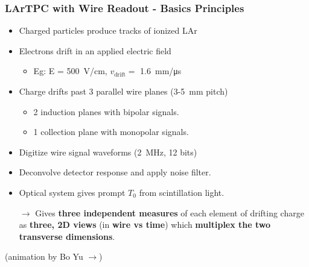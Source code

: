 \begin{frame}
  \frametitle{LArTPC with Wire Readout - Basics Principles}

  \begin{itemize}
  \item Charged particles produce tracks of ionized LAr
  \item Electrons drift in an applied electric field 
    \begin{itemize} \footnotesize
    \item Eg: E = \SI{500}{\volt/\cm}, $v_{\mbox{drift}}=$ \SI{1.6}{\milli\meter/\micro\second}
    \end{itemize}
  \item Charge drifts past 3 parallel wire planes (\num{3}-\SI{5}{\milli\meter} pitch)
    \begin{itemize}
    \item 2 induction planes with bipolar signals.
    \item 1 collection plane with monopolar signals.
    \end{itemize}
  \item Digitize wire signal waveforms (\SI{2}{\mega\hertz}, 12 bits)
  \item Deconvolve detector response and apply noise filter.
  \item Optical system gives prompt $T_0$ from scintillation light.
  \end{itemize}

  \begin{itemize}
  \item [$\rightarrow$] Gives \textbf{three independent measures} of
    each element of drifting charge as \textbf{three, 2D views} (in \textbf{wire
    vs time}) which \textbf{multiplex the two transverse dimensions}.
  \end{itemize}

  \vfill

  \flushright\footnotesize{(animation by Bo Yu $\rightarrow$)}

\end{frame}

\begin{frame}[fragile]
  \begin{center}
  \end{center}
\end{frame}

